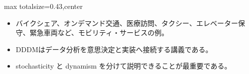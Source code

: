 \clearpage
{}
\begin{minipage}[t]{0.405\textwidth}
\begin{adjustbox}{max totalsize={\textwidth}{0.43\textheight},center}
\begin{minipage}{\textwidth}\scriptsize
{}\begin{itemize}
\item バイクシェア、オンデマンド交通、医療訪問、タクシー、エレベーター保守、緊急車両など、モビリティ・サービスの例。
\end{itemize}\begin{itemize}
\item DDDMはデータ分析を意思決定と実装へ接続する講義である。
\item stochasticity と dynamism を分けて説明できることが最重要である。
\end{itemize}
\end{minipage}
\end{adjustbox}
\end{minipage}\hfill
